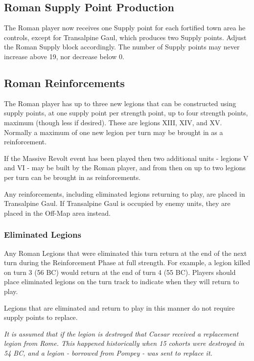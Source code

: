 \subsection{Roman Supply Point Production}
\par
The Roman player now receives one Supply point for each fortified town area he controls, except for Transalpine Gaul, which produces two Supply points. Adjust the Roman Supply block accordingly. The number of Supply points may never increase above 19, nor decrease below 0.

\subsection{Roman Reinforcements}\label{roman_reinforcements}
\par
The Roman player has up to three new legions that can be constructed using supply points, at one supply point per strength point, up to four strength points, maximum (though less if desired). These are legions XIII, XIV, and XV. Normally a maximum of one new legion per turn may be brought in as a reinforcement.

If the Massive Revolt event has been played then two additional units - legions V and VI - may be built by the Roman player, and from then on up to two legions per turn can be brought in as reinforcements.

Any reinforcements, including eliminated legions returning to play, are placed in Transalpine Gaul. If Transalpine Gaul is occupied by enemy units, they are placed in the Off-Map area instead.

\subsubsection{Eliminated Legions}
\par
Any Roman Legions that were eliminated this turn return at the end of the next turn during the Reinforcement Phase at full strength. For example, a legion killed on turn 3 (56 BC) would return at the end of turn 4 (55 BC). Players should place eliminated legions on the turn track to indicate when they will return to play.

Legions that are eliminated and return to play in this manner do not require supply points to replace.

\textit{It is assumed that if the legion is destroyed that Caesar received a replacement legion from Rome. This happened historically when 15 cohorts were destroyed in 54 BC, and a legion - borrowed from Pompey - was sent to replace it.}

